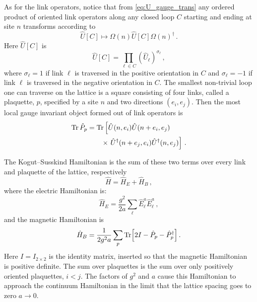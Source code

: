\documentclass[reprint,superscriptaddress,pra,nofootinbib,preprintnumbers,floatfix]{revtex4-1}
\begin{document}
As for the link operators, notice that from \cref{eq:U_gauge_trans} any ordered product of oriented link operators along any closed loop $C$ starting and ending at site $n$ transforms according to
%
\begin{equation}
    \hat{U}[C] \longmapsto \Omega(n) \hat{U}[C] \Omega(n)^\dagger \,.
\end{equation}
%
Here $\hat{U}[C]$ is
%
\begin{equation}
    \hat{U}[C] = \prod_{\ell \in C} (\hat{U}_\ell)^{\sigma_\ell} \,,
\end{equation}
%
where $\sigma_\ell = 1$ if link $\ell$ is traversed in the positive orientation in $C$ and $\sigma_\ell = -1$ if link $\ell$ is traversed in the negative orientation in $C$.
%
The smallest non-trivial loop one can traverse on the lattice is a square consisting of four links, called a plaquette, $p$, specified by a site $n$ and two directions $(e_i,e_j)$. 
%
Then the most local gauge invariant object formed out of link operators is
%
\begin{align}
\Tr\hat{P}_p &= \Tr \left[\hat{U}(n,e_i) \hat{U}(n+e_i, e_j) \right. \nonumber\\
& \qquad \times \left. \hat U^\dagger (n+e_j, e_i) \hat{U}^\dagger (n,e_j) \right] \,.
\end{align}

The Kogut--Susskind Hamiltonian is the sum of these two terms over every link and plaquette of the lattice, respectively
%
\begin{equation}\label{eq:H}
    \hat{H} = \hat{H}_E + \hat{H}_B \,,
\end{equation}
%
where the electric Hamiltonian is:
%
\begin{equation}\label{eq:HE}
    \hat{H}_E = \frac{g^2}{2a} \sum_\ell \hat{E}^a_\ell \hat{E}^a_\ell \,,
\end{equation}
%
and the magnetic Hamiltonian is
%
\begin{equation}\label{eq:HB}
    \hat{H}_B = \frac{1}{2g^2 a} \sum_p \Tr[2I - \hat P_p - \hat P_p^\dagger] \,.
\end{equation}
%
Here $I = I_{2\times 2}$ is the identity matrix, inserted so that the magnetic Hamiltonian is positive definite. 
%
The sum over plaquettes is the sum over only positively oriented plaquettes, $i<j$. 
%
The factors of $g^2$ and $a$ cause this Hamiltonian to approach the continuum Hamiltonian in the limit that the lattice spacing goes to zero $a \to 0$.
\end{document}
